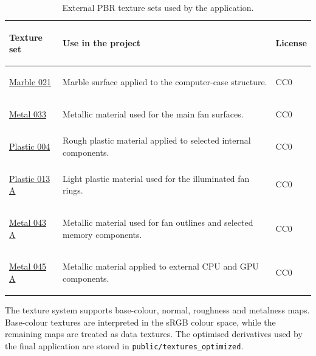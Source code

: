 \documentclass{report}
\begin{document}
\begin{table}[ht]
    \centering
    \small
    \setlength{\tabcolsep}{6pt}
    \renewcommand{\arraystretch}{1.22}

    \begin{tabularx}{\textwidth}{
        @{}
        >{\bfseries\raggedright\arraybackslash}p{}
        >{\raggedright\arraybackslash}X
        >{\centering\arraybackslash}p{}
        @{}
    }
        \toprule
        Texture set & Use in the project & License \\
        \midrule

        \href{https://ambientcg.com/view?id=Marble021}{Marble 021}
        &
        Marble surface applied to the computer-case structure.
        &
        CC0
        \\

        \href{https://ambientcg.com/view?id=Metal033}{Metal 033}
        &
        Metallic material used for the main fan surfaces.
        &
        CC0
        \\

        \href{https://ambientcg.com/view?id=Plastic004}{Plastic 004}
        &
        Rough plastic material applied to selected internal components.
        &
        CC0
        \\

        \href{https://ambientcg.com/view?id=Plastic013A}{Plastic 013 A}
        &
        Light plastic material used for the illuminated fan rings.
        &
        CC0
        \\

        \href{https://ambientcg.com/view?id=Metal043A}{Metal 043 A}
        &
        Metallic material used for fan outlines and selected memory
        components.
        &
        CC0
        \\

        \href{https://ambientcg.com/view?id=Metal045A}{Metal 045 A}
        &
        Metallic material applied to external CPU and GPU components.
        &
        CC0
        \\

        \bottomrule
    \end{tabularx}

    \caption{External PBR texture sets used by the application.}
    \label{tab:external-textures}
\end{table}

The texture system supports base-colour, normal, roughness and
metalness maps. Base-colour textures are interpreted in the sRGB colour
space, while the remaining maps are treated as data textures. The
optimised derivatives used by the final application are stored in
\texttt{public/textures\_optimized}.
\end{document}

